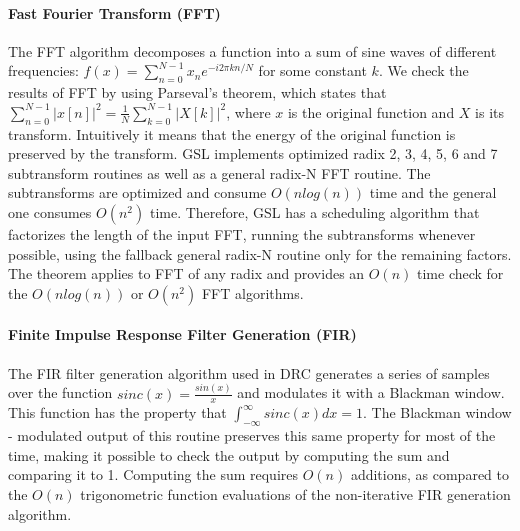 \documentclass{sig-alternate}
\begin{document}
\vspace{-5pt}
\paragraph{Fast Fourier Transform (FFT)}
The FFT algorithm decomposes a function into a sum of sine waves of different frequencies: $f(x) = \sum_{n=0}^{N-1} x_n e^{-i2\pi k n / N}$ for some constant $k$.
We check the results of FFT by using Parseval's theorem, which states that $\sum_{n=0}^{N-1} \left| x[n] \right|^2 = \frac{1}{N} \sum_{k=0}^{N-1} \left| X[k] \right|^2$, where $x$ is the original function and $X$ is its transform. 
Intuitively it means that the energy of the original function is preserved by the transform.
GSL implements optimized radix 2, 3, 4, 5, 6 and 7 subtransform routines as well as a general radix-N FFT routine. The subtransforms are optimized and consume $O(n log(n))$ time and the general one consumes $O(n^2)$ time. Therefore, GSL has a scheduling algorithm that factorizes the length of the input FFT, running the subtransforms whenever possible, using the fallback general radix-N routine only for the remaining factors.
The theorem applies to FFT of any radix and provides an $O(n)$ time check for the $O(n log(n))$ or $O(n^2)$ FFT algorithms.

\vspace{-5pt}
\paragraph{Finite Impulse Response Filter Generation (FIR)}
The FIR filter generation algorithm used in DRC generates a series of samples over the function $sinc(x)=\frac{sin(x)}{x}$
and modulates it with a Blackman window.
This function has the property that $\int_{-\infty}^{\infty} sinc(x)dx = 1$.
The Blackman window - modulated output of this routine preserves this same property for most of the time, making it possible to check the output by computing the sum and comparing it to 1.
Computing the sum requires $O(n)$ additions, as compared to the $O(n)$ trigonometric function evaluations of the non-iterative FIR generation algorithm.

\vspace{-5pt}
\end{document}
